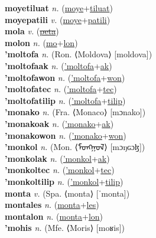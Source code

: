 \textbf{moyetiluat} \textit{n.} (\hyperref[moye]{moye}+\hyperref[tiluat]{tiluat})
 \label{moyetiluat} \\
\textbf{moyepatili} \textit{v.} (\hyperref[moye]{moye}+\hyperref[patili]{patili})
 \label{moyepatili} \\
\textbf{mola} \textit{v.} (\hyperref[peta]{\sout{peta}})
 \label{mola} \\
\textbf{molon} \textit{n.} (\hyperref[mo]{mo}+\hyperref[lon]{lon})
 \label{molon} \\
\textbf{'moltofa} \textit{n.} (Ron. ⟨Moldova⟩ [moldova])
 \label{'moltofa} \\
\textbf{'moltofaak} \textit{n.} (\hyperref['moltofa]{'moltofa}+\hyperref[ak]{ak})
 \label{'moltofaak} \\
\textbf{'moltofawon} \textit{n.} (\hyperref['moltofa]{'moltofa}+\hyperref[won]{won})
 \label{'moltofawon} \\
\textbf{'moltofatec} \textit{n.} (\hyperref['moltofa]{'moltofa}+\hyperref[tec]{tec})
 \label{'moltofatec} \\
\textbf{'moltofatilip} \textit{n.} (\hyperref['moltofa]{'moltofa}+\hyperref[tilip]{tilip})
 \label{'moltofatilip} \\
\textbf{'monako} \textit{n.} (Fra. ⟨Monaco⟩ [mɔnako])
 \label{'monako} \\
\textbf{'monakoak} \textit{n.} (\hyperref['monako]{'monako}+\hyperref[ak]{ak})
 \label{'monakoak} \\
\textbf{'monakowon} \textit{n.} (\hyperref['monako]{'monako}+\hyperref[won]{won})
 \label{'monakowon} \\
\textbf{'monkol} \textit{n.} (Mon. ⟨ᠮᠣᠩᠭᠣᠯ⟩ [mɔŋɢɔɮ])
 \label{'monkol} \\
\textbf{'monkolak} \textit{n.} (\hyperref['monkol]{'monkol}+\hyperref[ak]{ak})
 \label{'monkolak} \\
\textbf{'monkoltec} \textit{n.} (\hyperref['monkol]{'monkol}+\hyperref[tec]{tec})
 \label{'monkoltec} \\
\textbf{'monkoltilip} \textit{n.} (\hyperref['monkol]{'monkol}+\hyperref[tilip]{tilip})
 \label{'monkoltilip} \\
\textbf{monta} \textit{v.} (Spa. ⟨monta⟩ [ˈmonta])
 \label{monta} \\
\textbf{montales} \textit{n.} (\hyperref[monta]{monta}+\hyperref[les]{les})
 \label{montales} \\
\textbf{montalon} \textit{n.} (\hyperref[monta]{monta}+\hyperref[lon]{lon})
 \label{montalon} \\
\textbf{'mohis} \textit{n.} (Mfe. ⟨Moris⟩ [moʁis])
